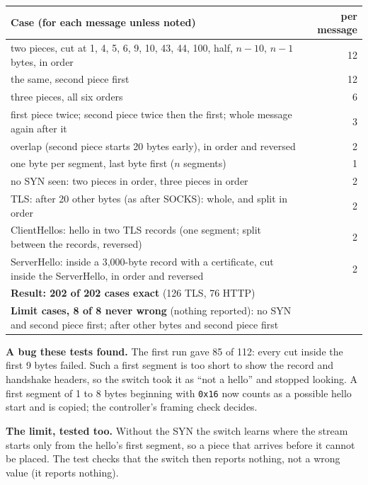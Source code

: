 \documentclass[11pt,a4paper]{article}
\newcommand{\code}[1]{\texttt{#1}}
\begin{document}
\begin{tabularx}{\textwidth}{X r}
\toprule
\textbf{Case} (for each message unless noted) & \textbf{per message} \\
\midrule
two pieces, cut at 1, 4, 5, 6, 9, 10, 43, 44, 100, half, $n-10$, $n-1$ bytes, in order & 12 \\
the same, second piece first & 12 \\
three pieces, all six orders & 6 \\
first piece twice; second piece twice then the first; whole message again after it & 3 \\
overlap (second piece starts 20 bytes early), in order and reversed & 2 \\
one byte per segment, last byte first ($n$ segments) & 1 \\
no SYN seen: two pieces in order, three pieces in order & 2 \\
TLS: after 20 other bytes (as after SOCKS): whole, and split in order & 2 \\
ClientHellos: hello in two TLS records (one segment; split between the records, reversed) & 2 \\
ServerHello: inside a 3,000-byte record with a certificate, cut inside the ServerHello, in order and reversed & 2 \\
\midrule
\textbf{Result: 202 of 202 cases exact} (126 TLS, 76 HTTP) & \\
\textbf{Limit cases, 8 of 8 never wrong} (nothing reported): no SYN and second piece first; after other bytes and second piece first & \\
\bottomrule
\end{tabularx}

\textbf{A bug these tests found.} The first run gave 85 of 112: every cut inside the first 9 bytes failed. Such a
first segment is too short to show the record and handshake headers, so the switch took it as ``not a hello'' and
stopped looking. A first segment of 1 to 8 bytes beginning with \code{0x16} now counts as a possible hello start
and is copied; the controller's framing check decides.

\textbf{The limit, tested too.} Without the SYN the switch learns where the stream starts only from the hello's
first segment, so a piece that arrives before it cannot be placed. The test checks that the switch then reports
nothing, not a wrong value (it reports nothing).
\end{document}
